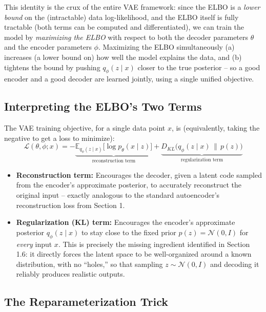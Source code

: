\documentclass[12pt,a4paper]{article}
\begin{document}
\begin{keyidea}
This identity is the crux of the entire VAE framework: since the ELBO is a \emph{lower bound} on the (intractable) data log-likelihood, and the ELBO itself is fully tractable (both terms can be computed and differentiated), we can train the model by \emph{maximizing the ELBO} with respect to both the decoder parameters $\theta$ and the encoder parameters $\phi$. Maximizing the ELBO simultaneously (a) increases (a lower bound on) how well the model explains the data, and (b) tightens the bound by pushing $q_\phi(z\mid x)$ closer to the true posterior -- so a good encoder and a good decoder are learned jointly, using a single unified objective.
\end{keyidea}

\subsection{Interpreting the ELBO's Two Terms}

The VAE training objective, for a single data point $x$, is (equivalently, taking the negative to get a loss to minimize):
\[
\mathcal{L}(\theta,\phi; x) = -\underbrace{\mathbb{E}_{q_\phi(z\mid x)}\big[\log p_\theta(x\mid z)\big]}_{\text{reconstruction term}} + \underbrace{D_{KL}\big(q_\phi(z\mid x) \,\|\, p(z)\big)}_{\text{regularization term}}
\]

\begin{itemize}[leftmargin=1.5em]
    \item \textbf{Reconstruction term:} Encourages the decoder, given a latent code sampled from the encoder's approximate posterior, to accurately reconstruct the original input -- exactly analogous to the standard autoencoder's reconstruction loss from Section 1.
    \item \textbf{Regularization (KL) term:} Encourages the encoder's approximate posterior $q_\phi(z\mid x)$ to stay close to the fixed prior $p(z) = \mathcal{N}(0,I)$ for \emph{every} input $x$. This is precisely the missing ingredient identified in Section 1.6: it directly forces the latent space to be well-organized around a known distribution, with no ``holes,'' so that sampling $z \sim \mathcal{N}(0,I)$ and decoding it reliably produces realistic outputs.
\end{itemize}

\subsection{The Reparameterization Trick}
\end{document}
